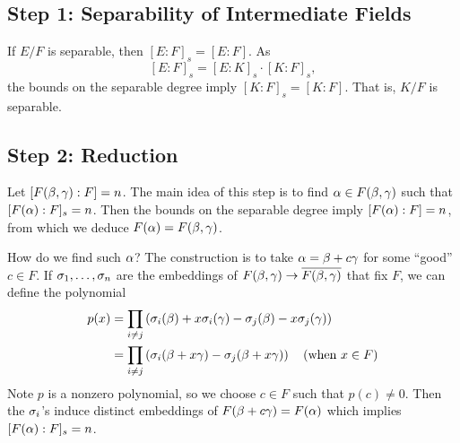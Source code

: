\subsection{Step 1: Separability of Intermediate Fields}
If $E/F$ is separable, then $[E:F]_s = [E:F]$. As
\[
    [E:F]_s = [E:K]_s \cdot [K:F]_s,
\]
the bounds on the separable degree imply $[K:F]_s = [K:F]$. That is, $K/F$ is separable.

\subsection{Step 2: Reduction}
Let $[F(\beta,\gamma):F] = n$. The main idea of this step is to find $\alpha \in F(\beta,\gamma)$ such that $[F(\alpha):F]_s = n$. Then the bounds on the separable degree imply $[F(\alpha):F] = n$, from which we deduce $F(\alpha) = F(\beta,\gamma)$.

How do we find such $\alpha$? The construction is to take $\alpha = \beta + c\gamma$ for some ``good'' $c \in F$. If $\sigma_1, \dots, \sigma_n$ are the embeddings of $F(\beta,\gamma) \to \overline{F(\beta,\gamma)}$ that fix $F$, we can define the polynomial
\[
    \begin{split}
        p(x) &= \prod_{i \neq j} \left( \sigma_i(\beta) + x\sigma_i(\gamma) - \sigma_j(\beta) - x\sigma_j(\gamma) \right)\\
             &= \prod_{i \neq j} \left( \sigma_i(\beta + x\gamma) - \sigma_j(\beta + x\gamma) \right) \quad (\text{when } x \in F)\\
    \end{split}
\]
Note $p$ is a nonzero polynomial, so we choose $c \in F$ such that $p(c) \neq 0$. Then the $\sigma_i$'s induce distinct embeddings of $F(\beta + c\gamma) = F(\alpha)$ which implies $[F(\alpha):F]_s = n$.
